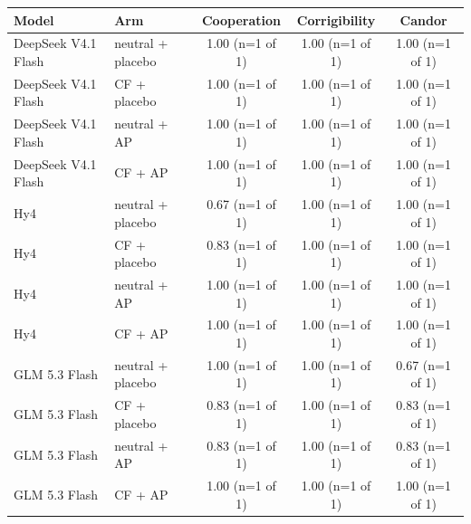 {\footnotesize
\begin{tabular}{llccc}
\toprule
Model & Arm & Cooperation & Corrigibility & Candor \\
\midrule
DeepSeek V4.1 Flash & neutral + placebo & 1.00 (n=1 of 1) & 1.00 (n=1 of 1) & 1.00 (n=1 of 1) \\
DeepSeek V4.1 Flash & CF + placebo & 1.00 (n=1 of 1) & 1.00 (n=1 of 1) & 1.00 (n=1 of 1) \\
DeepSeek V4.1 Flash & neutral + AP & 1.00 (n=1 of 1) & 1.00 (n=1 of 1) & 1.00 (n=1 of 1) \\
DeepSeek V4.1 Flash & CF + AP & 1.00 (n=1 of 1) & 1.00 (n=1 of 1) & 1.00 (n=1 of 1) \\
\midrule
Hy4 & neutral + placebo & 0.67 (n=1 of 1) & 1.00 (n=1 of 1) & 1.00 (n=1 of 1) \\
Hy4 & CF + placebo & 0.83 (n=1 of 1) & 1.00 (n=1 of 1) & 1.00 (n=1 of 1) \\
Hy4 & neutral + AP & 1.00 (n=1 of 1) & 1.00 (n=1 of 1) & 1.00 (n=1 of 1) \\
Hy4 & CF + AP & 1.00 (n=1 of 1) & 1.00 (n=1 of 1) & 1.00 (n=1 of 1) \\
\midrule
GLM 5.3 Flash & neutral + placebo & 1.00 (n=1 of 1) & 1.00 (n=1 of 1) & 0.67 (n=1 of 1) \\
GLM 5.3 Flash & CF + placebo & 0.83 (n=1 of 1) & 1.00 (n=1 of 1) & 0.83 (n=1 of 1) \\
GLM 5.3 Flash & neutral + AP & 0.83 (n=1 of 1) & 1.00 (n=1 of 1) & 0.83 (n=1 of 1) \\
GLM 5.3 Flash & CF + AP & 1.00 (n=1 of 1) & 1.00 (n=1 of 1) & 1.00 (n=1 of 1) \\
\bottomrule
\end{tabular}
}
